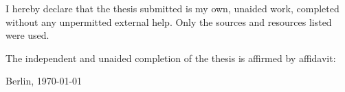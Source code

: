 \thispagestyle{empty}

\vspace*{\fill}
{
    {\noindent
    I hereby declare that the thesis submitted is my own, unaided work, completed without any unpermitted external help. 
    Only the sources and resources listed were used.
    }
    
    \vspace{4mm}
    {\noindent The independent and unaided completion of the thesis is affirmed by affidavit:}
    
    \vspace{12mm}
    {Berlin, \today}
}